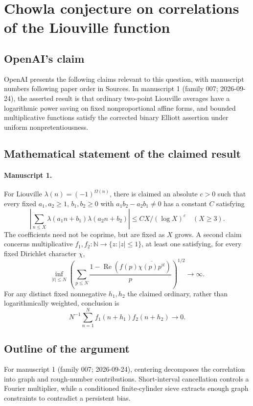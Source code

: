 \documentclass[11pt]{article}
\begin{document}
\section*{Chowla conjecture on correlations of the Liouville function}

\subsection{OpenAI's claim}
OpenAI presents the following claims relevant to this question, with manuscript numbers following paper order in Sources. In manuscript 1 (family 007; 2026-09-24), the asserted result is that ordinary two-point Liouville averages have a logarithmic power saving on fixed nonproportional affine forms, and bounded multiplicative functions satisfy the corrected binary Elliott assertion under uniform nonpretentiousness.

\subsection{Mathematical statement of the claimed result}
\paragraph{Manuscript 1.}
For Liouville $\lambda(n)=(-1)^{\Omega(n)}$, there is claimed an absolute $c>0$ such that every fixed $a_1,a_2\ge1$, $b_1,b_2\ge0$ with $a_1b_2-a_2b_1\ne0$ has a constant $C$ satisfying
\[
 |\sum_{n\le X}\lambda(a_1n+b_1)\lambda(a_2n+b_2)|\le C X/(\log X)^c\quad(X\ge3).
\]
The coefficients need not be coprime, but are fixed as $X$ grows. A second claim concerns multiplicative $f_1,f_2:\mathbb N\to\{z:|z|\le1\}$, at least one satisfying, for every fixed Dirichlet character $\chi$,
\[
 \inf_{|t|\le N}\left(\sum_{p\le N}\frac{1-\operatorname{Re}(f(p)\overline{\chi(p)p^{it}})}p\right)^{1/2}\longrightarrow\infty.
\]
For any distinct fixed nonnegative $h_1,h_2$ the claimed ordinary, rather than logarithmically weighted, conclusion is
\[
 N^{-1}\sum_{n=1}^Nf_1(n+h_1)f_2(n+h_2)\longrightarrow0.
\]

\subsection{Outline of the argument}
For manuscript 1 (family 007; 2026-09-24), centering decomposes the correlation into graph and rough-number contributions. Short-interval cancellation controls a Fourier multiplier, while a conditioned finite-cylinder sieve extracts enough graph constraints to contradict a persistent bias.
\end{document}
